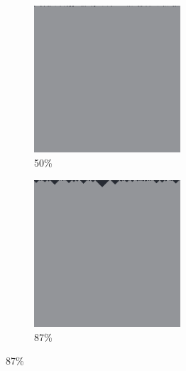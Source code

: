 \documentclass[12pt, fleqn]{report}                             %
\theoremstyle{break}                                            %
\begin{document}
\begin{figure}[ht!]
\begin{subfigure}[b]{0.4\linewidth}
          \includegraphics[width=0.6\textwidth]{Images/50/c.png}
          \caption{50\%}
        \end{subfigure}
        \begin{subfigure}[b]{0.4\linewidth}
          \includegraphics[width=0.6\textwidth]{Images/50/d.png}
          \caption{87\%}
        \end{subfigure}
      \end{figure}
\end{document}
